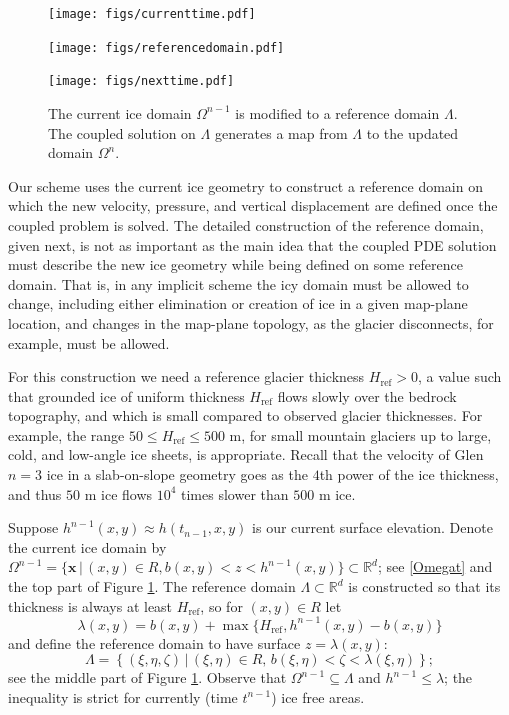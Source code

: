\documentclass[letterpaper,final,12pt,reqno]{amsart}
\newcommand{\RR}{\mathbb{R}}
\newcommand{\bx}{\mathbf{x}}
\newcommand{\Href}{H_{\text{ref}}}
\begin{document}
\begin{figure}[ht]
\begin{center}
\texttt{[image: figs/currenttime.pdf]}
\vspace{-6mm}

\texttt{[image: figs/referencedomain.pdf]}
\vspace{-1mm}

\texttt{[image: figs/nexttime.pdf]}
\end{center}
\caption{The current ice domain $\Omega^{n-1}$ is modified to a reference domain $\Lambda$.  The coupled solution on $\Lambda$ generates a map from $\Lambda$ to the updated domain $\Omega^n$.}
\label{fig:domainupdate}
\end{figure}

Our scheme uses the current ice geometry to construct a reference domain on which the new velocity, pressure, and vertical displacement are defined once the coupled problem is solved.  The detailed construction of the reference domain, given next, is not as important as the main idea that the coupled PDE solution must describe the new ice geometry while being defined on some reference domain.  That is, in any implicit scheme the icy domain must be allowed to change, including either elimination or creation of ice in a given map-plane location, and changes in the map-plane topology, as the glacier disconnects, for example, must be allowed.

For this construction we need a reference glacier thickness $\Href>0$, a value such that grounded ice of uniform thickness $\Href$ flows slowly over the bedrock topography, and which is small compared to observed glacier thicknesses.  For example, the range $50 \le \Href \le 500$ m, for small mountain glaciers up to large, cold, and low-angle ice sheets, is appropriate.  Recall that the velocity of Glen $n=3$ ice in a slab-on-slope geometry \cite{GreveBlatter2009} goes as the $4$th power of the ice thickness, and thus $50$ m ice flows $10^4$ times slower than $500$ m ice.

Suppose $h^{n-1}(x,y) \approx h(t_{n-1},x,y)$ is our current surface elevation.  Denote the current ice domain by $\Omega^{n-1}=\{\bx\,\big|\,(x,y)\in R, b(x,y)<z<h^{n-1}(x,y)\} \subset \RR^d$; see \eqref{Omegat} and the top part of Figure \ref{fig:domainupdate}.  The reference domain $\Lambda \subset \RR^d$ is constructed so that its thickness is always at least $\Href$, so for $(x,y) \in R$ let
\begin{equation}
\lambda(x,y) = b(x,y) + \max\{\Href,h^{n-1}(x,y)-b(x,y)\} \label{definelambda}
\end{equation}
and define the reference domain to have surface $z=\lambda(x,y)$:
\begin{equation}
\Lambda = \left\{(\xi,\eta,\zeta)\,\big|\,(\xi,\eta)\in R, \, b(\xi,\eta) < \zeta < \lambda(\xi,\eta)\right\};  \label{Lambda}
\end{equation}
see the middle part of Figure \ref{fig:domainupdate}.  Observe that $\Omega^{n-1} \subseteq \Lambda$ and $h^{n-1} \le \lambda$; the inequality is strict for currently (time $t^{n-1}$) ice free areas.
\end{document}
